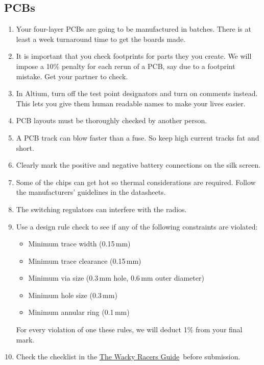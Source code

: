 \documentclass[11pt, a4paper]{article}
\newcommand{\theguide}{\href{https://eng-git.canterbury.ac.nz/wacky-racers/wacky-racers/-/blob/master/doc/guide/guide.pdf}{The Wacky Racers Guide}}
\begin{document}
\subsection{PCBs}

\begin{enumerate}
\item Your four-layer PCBs are going to be manufactured in batches.
  There is at least a week turnaround time to get the boards made.

\item It is important that you check footprints for parts they you
  create.  We will impose a 10\% penalty for each rerun of a PCB, say
  due to a footprint mistake.  Get your partner to check.

\item In Altium, turn off the test point designators and turn on
  comments instead. This lets you give them human readable names to
  make your lives easier.

\item PCB layouts must be thoroughly checked by another person.

\item A PCB track can blow faster than a fuse. So keep high current
  tracks fat and short.

\item Clearly mark the positive and negative battery connections on
  the silk screen.

\item Some of the chips can get hot so thermal considerations are
  required.  Follow the manufacturers' guidelines in the datasheets.

\item The switching regulators can interfere with the radios.

\item Use a design rule check to see if any of the following
  constraints are violated:
%
\begin{itemize}
\item Minimum trace width (0.15\,mm)
\item Minimum trace clearance (0.15\,mm)
\item Minimum via size (0.3\,mm hole, 0.6\,mm outer diameter)
\item Minimum hole size (0.3\,mm)
\item Minimum annular ring (0.1\,mm)
\end{itemize}
%
For every violation of one these rules, we will deduct 1\% from your
final mark.

\item Check the checklist in the \theguide\ before submission.
\end{enumerate}
\end{document}
